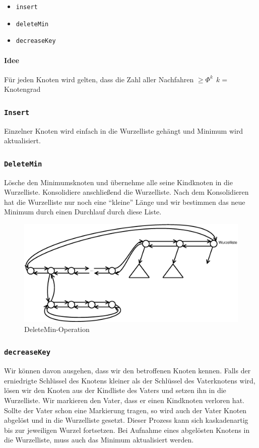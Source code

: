 \begin{itemize}
	\item \texttt{insert}
	\item \texttt{deleteMin}
	\item \texttt{decreaseKey}
\end{itemize}

\paragraph{Idee}
Für jeden Knoten wird gelten, dass die Zahl aller Nachfahren $\geq \Phi^k~~k=$Knotengrad

\subsubsection{\texttt{Insert}}
Einzelner Knoten wird einfach in die Wurzelliste gehängt und Minimum wird aktualisiert.

\subsubsection{\texttt{DeleteMin}}
Lösche den Minimumsknoten und übernehme alle seine Kindknoten in die Wurzelliste. Konsolidiere anschließend die Wurzelliste. Nach dem Konsolidieren hat die Wurzelliste nur noch eine "`kleine"' Länge und wir bestimmen das neue Minimum durch einen Durchlauf durch diese Liste.
\begin{figure}[H]
	\centering
	\includegraphics[width=0.65\linewidth]{21/Grafik/deleteMin}
	\caption{DeleteMin-Operation}
\end{figure}

\subsubsection{\texttt{decreaseKey}}
Wir können davon ausgehen, dass wir den betroffenen Knoten kennen. Falls der erniedrigte Schlüssel des Knotens kleiner als der Schlüssel des Vaterknotens wird, lösen wir den Knoten aus der Kindliste des Vaters und setzen ihn in die Wurzelliste. Wir markieren den Vater, dass er einen Kindknoten verloren hat. Sollte der Vater schon eine Markierung tragen, so wird auch der Vater Knoten abgelöst und in die Wurzelliste gesetzt. Dieser Prozess kann sich kaskadenartig bis zur jeweiligen Wurzel fortsetzen. Bei Aufnahme eines abgelösten Knotens in die Wurzelliste, muss auch das Minimum aktualisiert werden.

